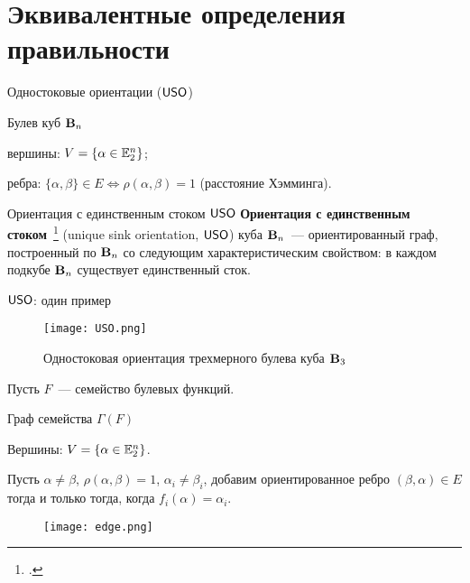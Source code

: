 \section{Эквивалентные определения правильности}


\begin{frame}{Одностоковые ориентации ($\mathsf{USO}$)}
    \begin{myexample}{Булев куб  $\mathbf{B}_n$}
        \begin{coloritemize}
            \item вершины: $V = \{ \alpha \in \mathbb{E}_2^n \}$;
            \item ребра: $\{\alpha, \beta \} \in E \Leftrightarrow \rho(\alpha, \beta) = 1$ (расстояние Хэмминга).
        \end{coloritemize}
    \end{myexample}
    \pause 
    \begin{myexample}{Ориентация с единственным стоком $\mathsf{USO}$}
        \textbf{Ориентация с единственным стоком}~\footcite{szabo2001} (unique sink orientation, $\mathsf{USO}$) куба $\mathbf{B}_n$~--- ориентированный граф, построенный по $\mathbf{B}_n$ со следующим характеристическим свойством: в каждом подкубе $\mathbf{B}_n$ существует единственный сток.
    \end{myexample}
\end{frame}  

  
\begin{frame}{$\mathsf{USO}$: один пример}
    \begin{figure}
          \centering
          \texttt{[image: USO.png]}
          \caption{Одностоковая ориентация трехмерного булева куба $\mathbf{B}_3$}
    \end{figure}
\end{frame}


\begin{frame}%
    Пусть $F$~--- семейство булевых функций.
    \begin{myexample}{Граф семейства $\Gamma(F)$}
        \begin{coloritemize}
            \item Вершины: $V = \{ \alpha \in \mathbb{E}_2^n \}$.
            \item Пусть $\alpha \ne \beta$, $\rho(\alpha, \beta) = 1$, $\alpha_i \ne \beta_i$, добавим ориентированное ребро $(\beta, \alpha) \in E$ тогда и только тогда, когда $f_i(\alpha) = \alpha_i$.
        \end{coloritemize}
    \end{myexample}
    \pause
    \begin{figure}
        \centering
        \texttt{[image: edge.png]}
    \end{figure}
\end{frame}


